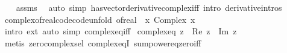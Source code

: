\begin{isabellebody}
%
\isadelimproof
\ \ %
\endisadelimproof
%
\isatagproof
{}\isamarkupfalse%
\ assms\ \isamarkupfalse%
\ {\isacharparenleft}{\kern0pt}auto\ simp{\isacharcolon}{\kern0pt}\ has{\isacharunderscore}{\kern0pt}vector{\isacharunderscore}{\kern0pt}derivative{\isacharunderscore}{\kern0pt}complex{\isacharunderscore}{\kern0pt}iff\ intro{\isacharcolon}{\kern0pt}\ derivative{\isacharunderscore}{\kern0pt}intros{\isacharparenright}{\kern0pt}%
\endisatagproof
{\isafoldproof}%
%
\isadelimproof
%
\endisadelimproof
%
\isadelimdocument
%
\endisadelimdocument
%
\isatagdocument
%
\isamarkuptrue%
%
\endisatagdocument
{\isafolddocument}%
%
\isadelimdocument
%
\endisadelimdocument
{}\isamarkupfalse%
\ complex{\isacharunderscore}{\kern0pt}of{\isacharunderscore}{\kern0pt}real{\isacharunderscore}{\kern0pt}code{\isacharbrackleft}{\kern0pt}code{\isacharunderscore}{\kern0pt}unfold{\isacharbrackright}{\kern0pt}{\isacharcolon}{\kern0pt}\ {\isachardoublequoteopen}of{\isacharunderscore}{\kern0pt}real\ {\isacharequal}{\kern0pt}\ {\isacharparenleft}{\kern0pt}{\isasymlambda}x{\isachardot}{\kern0pt}\ Complex\ x\ {}{\isacharparenright}{\kern0pt}{\isachardoublequoteclose}\ \isanewline
%
\isadelimproof
\ \ %
\endisadelimproof
%
\isatagproof
{}\isamarkupfalse%
\ {\isacharparenleft}{\kern0pt}intro\ ext{\isacharcomma}{\kern0pt}\ auto\ simp{\isacharcolon}{\kern0pt}\ complex{\isacharunderscore}{\kern0pt}eq{\isacharunderscore}{\kern0pt}iff{\isacharparenright}{\kern0pt}%
\endisatagproof
{\isafoldproof}%
%
\isadelimproof
\isanewline
%
\endisadelimproof
\isanewline
{}\isamarkupfalse%
\ complex{\isacharunderscore}{\kern0pt}eq{\isacharunderscore}{\kern0pt}{}{\isacharcolon}{\kern0pt}\ {\isachardoublequoteopen}z{\isacharequal}{\kern0pt}{}\ {\isasymlongleftrightarrow}\ {\isacharparenleft}{\kern0pt}Re\ z{\isacharparenright}{\kern0pt}\ {\isacharplus}{\kern0pt}\ {\isacharparenleft}{\kern0pt}Im\ z{\isacharparenright}{\kern0pt}\ {\isacharequal}{\kern0pt}\ {}{\isachardoublequoteclose}\isanewline
%
\isadelimproof
\ \ %
\endisadelimproof
%
\isatagproof
{}\isamarkupfalse%
\ {\isacharparenleft}{\kern0pt}metis\ zero{\isacharunderscore}{\kern0pt}complex{\isachardot}{\kern0pt}sel\ complex{\isacharunderscore}{\kern0pt}eqI\ sum{\isacharunderscore}{\kern0pt}power{}{\isacharunderscore}{\kern0pt}eq{\isacharunderscore}{\kern0pt}zero{\isacharunderscore}{\kern0pt}iff{\isacharparenright}{\kern0pt}%

\end{isabellebody}
